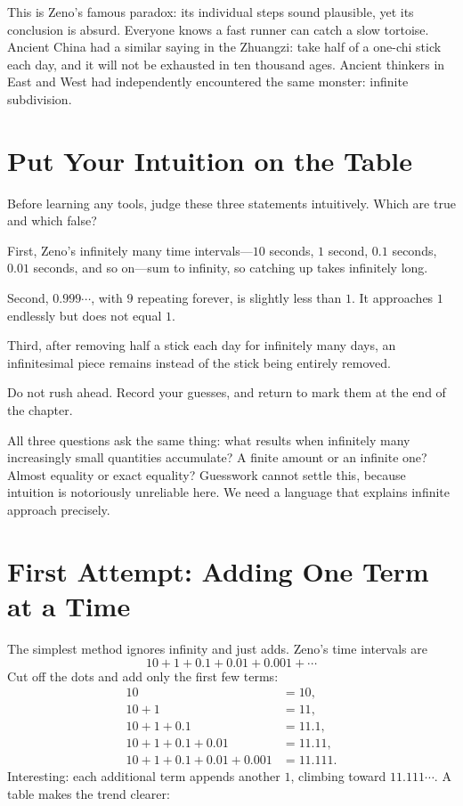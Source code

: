This is Zeno's famous paradox: its individual steps sound plausible, yet its conclusion is absurd. Everyone knows a fast runner can catch a slow tortoise. Ancient China had a similar saying in the Zhuangzi: take half of a one-chi stick each day, and it will not be exhausted in ten thousand ages. Ancient thinkers in East and West had independently encountered the same monster: infinite subdivision.

\section{Put Your Intuition on the Table}

Before learning any tools, judge these three statements intuitively. Which are true and which false?

First, Zeno's infinitely many time intervals---$10$ seconds, $1$ second, $0.1$ seconds, $0.01$ seconds, and so on---sum to infinity, so catching up takes infinitely long.

Second, $0.999\cdots$, with $9$ repeating forever, is slightly less than $1$. It approaches $1$ endlessly but does not equal $1$.

Third, after removing half a stick each day for infinitely many days, an infinitesimal piece remains instead of the stick being entirely removed.

Do not rush ahead. Record your guesses, and return to mark them at the end of the chapter.

All three questions ask the same thing: what results when infinitely many increasingly small quantities accumulate? A finite amount or an infinite one? Almost equality or exact equality? Guesswork cannot settle this, because intuition is notoriously unreliable here. We need a language that explains infinite approach precisely.

\section{First Attempt: Adding One Term at a Time}

The simplest method ignores infinity and just adds. Zeno's time intervals are
\[
10+1+0.1+0.01+0.001+\cdots
\]
Cut off the dots and add only the first few terms:
\[
\begin{aligned}
10 &= 10,\\
10+1 &= 11,\\
10+1+0.1 &= 11.1,\\
10+1+0.1+0.01 &= 11.11,\\
10+1+0.1+0.01+0.001 &= 11.111.
\end{aligned}
\]
Interesting: each additional term appends another $1$, climbing toward $11.111\cdots$. A table makes the trend clearer:

